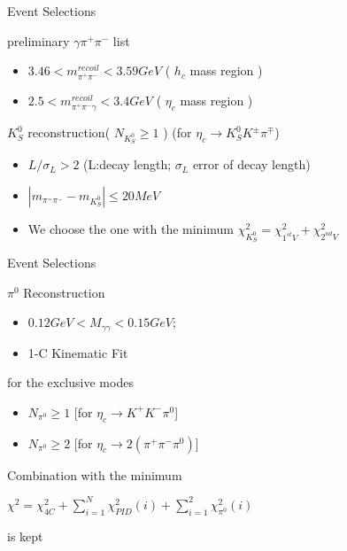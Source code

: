 \documentclass{beamer}
\begin{document}
\begin{frame}{Event Selections}
  \begin{block}{preliminary $\gamma\pi^+\pi^-$ list}
    \begin{itemize}
      \item $3.46<m_{\pi^+\pi^-}^{recoil}<3.59 GeV$ ( $h_c$ mass region )
      \item $2.5<m_{\pi^+\pi^-\gamma}^{recoil}<3.4 GeV$ ( $\eta_c$ mass region )
    \end{itemize}
  \end{block}
  \begin{block}{$K_S^0$ reconstruction( $N_{K_S^0}\ge 1 $ ) (for $\eta_c\to K^0_S K^{\pm} \pi^{\mp}$)}
    \begin{itemize}
      \item $L/\sigma_L > 2$ (L:decay length; $\sigma_L$ error of decay length)
      \item $| m_{\pi^=\pi^-} - m_{K_S^0}|\le 20 MeV$
      \item We choose the one with the minimum $\chi_{K^0_S}^2 = \chi^2_{1^{st}V} + \chi^2_{2^{nd}V}$
    \end{itemize}
  \end{block}
\end{frame}
\begin{frame}{Event Selections}
  \begin{block}{$\pi^0$ Reconstruction}
    \begin{itemize}
      \item $0.12GeV<M_{\gamma\gamma}<0.15GeV$;
      \item 1-C Kinematic Fit
    \end{itemize}
  \end{block}
  \begin{block}{for the exclusive modes}
    \begin{itemize}
      \item  $N_{\pi^0}\geq 1$ [for $\eta_c\to K^+K^-\pi^0$]
      \item  $N_{\pi^0}\geq 2$ [for $\eta_c\to 2(\pi^+\pi^-\pi^0)$]
    \end{itemize}
  \end{block}
  Combination with the minimum 
    \begin{center}
      $\chi^2 = \chi^2_{4C} + \sum^N_{i=1}\chi^2_{PID}(i)+\sum^2_{i=1}\chi^2_{\pi^0}(i)$
    \end{center}is kept 
\end{frame}
\end{document}

